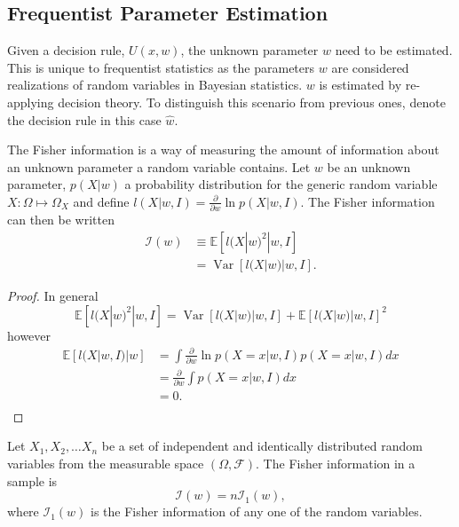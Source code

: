 \subsection{Frequentist Parameter Estimation}
Given a decision rule, $U(x,w)$, the unknown parameter $w$ need to be estimated. This is unique to frequentist statistics as the parameters $w$ are considered realizations of random variables in Bayesian statistics. $w$ is estimated by re-applying decision theory. To distinguish this scenario from previous ones, denote the decision rule in this case $\hat{w}$.


\begin{definition}
	\label{def:fisher_information}
	The Fisher information is a way of measuring the amount of information about an unknown parameter a random variable contains. Let $w$ be an unknown parameter, $p(X|w)$ a probability distribution for the generic random variable $X:\Omega\mapsto \Omega_X$ and define $l(X|w,I)= \frac{\partial}{\partial w} \ln p(X|w,I)$. The Fisher information can then be written
	\begin{equation}
		\begin{split}
			\mathcal{I}(w) &\equiv \mathbb{E} [l(X|w)^2|w,I]\\
			&= \operatorname{Var}[l(X|w)|w,I].
		\end{split}
	\end{equation}
\end{definition}

\begin{proof}
	In general 
	\begin{equation}
		\mathbb{E} [l(X|w)^2|w,I] = \operatorname{Var}[l(X|w)|w,I]+\mathbb{E}[l(X|w)|w,I]^2
	\end{equation}
	however
	\begin{equation}
		\begin{split}
			\mathbb{E}[l(X|w,I)|w] &= \int  \frac{\partial}{\partial w} \ln p(X=x|w,I) p(X=x|w,I) dx\\
			&= \frac{\partial}{\partial w}\int  p(X=x|w,I) dx\\
			&= 0.\\
		\end{split}
	\end{equation}
\end{proof}


\begin{theorem}
	Let $X_1,X_2,\dots X_n$ be a set of independent and identically distributed random variables from the measurable space $(\Omega,\mathcal{F})$. The Fisher information in a sample is 
	\begin{equation}
		\mathcal{I}(w) = n\mathcal{I}_1(w),
	\end{equation}
	where $\mathcal{I}_1(w)$ is the Fisher information of any one of the random variables.
\end{theorem}


